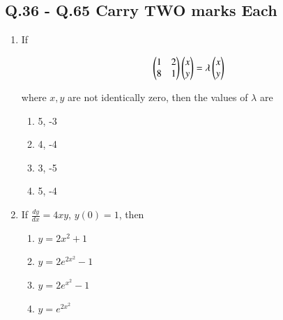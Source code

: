 \documentclass[journal]{IEEEtran}
\theoremstyle{remark}
\begin{document}
\subsection*{Q.36 - Q.65 Carry TWO marks Each}
\begin{enumerate}[resume]
\item If

\begin{align}
\begin{pmatrix} 1 & 2 \\ 8 & 1 \end{pmatrix} \begin{pmatrix} x \\ y \end{pmatrix} = \lambda\begin{pmatrix} x \\ y\end{pmatrix}
\end{align}

where $x, y$ are not identically zero, then the values of $\lambda$ are \hfill{}
\begin{multicols}{4}
\begin{enumerate}
\item 5, -3
\item 4, -4
\item 3, -5
\item 5, -4
\end{enumerate}
\end{multicols}

\item If $\frac{dy}{dx} = 4xy$, $y(0) = 1$, then \hfill{}
\begin{multicols}{2}
\begin{enumerate}
\item $y = 2x^2 + 1$
\item $y = 2e^{2x^2} - 1$
\item $y = 2e^{x^2} - 1$
\item $y = e^{2x^2}$
\end{enumerate}
\end{multicols}


\end{enumerate}
\end{document}
